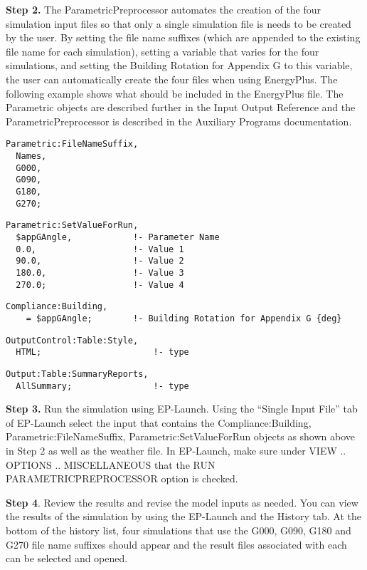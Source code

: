 \textbf{Step 2.} The ParametricPreprocessor automates the creation of the four simulation input files so that only a single simulation file is needs to be created by the user. By setting the file name suffixes (which are appended to the existing file name for each simulation), setting a variable that varies for the four simulations, and setting the Building Rotation for Appendix G to this variable, the user can automatically create the four files when using EnergyPlus. The following example shows what should be included in the EnergyPlus file. The Parametric objects are described further in the Input Output Reference and the ParametricPreprocessor is described in the Auxiliary Programs documentation.

\begin{lstlisting}
Parametric:FileNameSuffix,
  Names,
  G000,
  G090,
  G180,
  G270;
\end{lstlisting}

\begin{lstlisting}
Parametric:SetValueForRun,
  $appGAngle,            !- Parameter Name
  0.0,                   !- Value 1
  90.0,                  !- Value 2
  180.0,                 !- Value 3
  270.0;                 !- Value 4
\end{lstlisting}

\begin{lstlisting}
Compliance:Building,
    = $appGAngle;        !- Building Rotation for Appendix G {deg}
\end{lstlisting}

\begin{lstlisting}
OutputControl:Table:Style,
  HTML;                      !- type
\end{lstlisting}

\begin{lstlisting}
Output:Table:SummaryReports,
  AllSummary;                !- type
\end{lstlisting}

\textbf{Step 3.} Run the simulation using EP-Launch. Using the ``Single Input File'' tab of EP-Launch select the input that contains the Compliance:Building, Parametric:FileNameSuffix, Parametric:SetValueForRun objects as shown above in Step 2 as well as the weather file. In EP-Launch, make sure under VIEW .. OPTIONS .. MISCELLANEOUS that the RUN PARAMETRICPREPROCESSOR option is checked.

\textbf{Step 4}. Review the results and revise the model inputs as needed. You can view the results of the simulation by using the EP-Launch and the History tab. At the bottom of the history list, four simulations that use the G000, G090, G180 and G270 file name suffixes should appear and the result files associated with each can be selected and opened.

